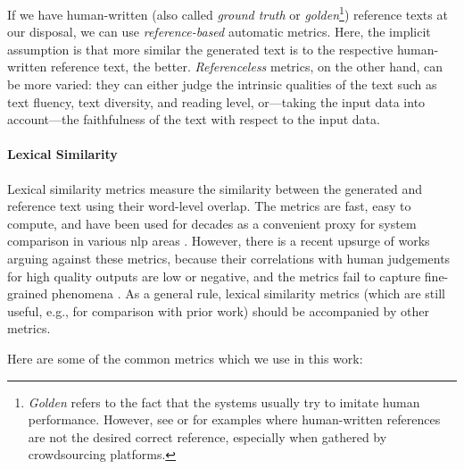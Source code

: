 If we have human-written (also called \emph{ground truth} or \emph{golden}\footnote{\emph{Golden} refers to the fact that the systems usually try to imitate human performance. However, see \citet{clarkAllThatHuman2021} or \citet{dusekSemanticNoiseMatters2019} for examples where human-written references are not the desired correct reference, especially when gathered by crowdsourcing platforms.}) reference texts at our disposal, we can use \emph{reference-based}  automatic metrics. Here, the implicit assumption is that more similar the generated text is to the respective human-written reference text, the better. \emph{Referenceless} metrics, on the other hand, can be more varied: they can either judge the intrinsic qualities of the text such as text fluency, text diversity, and reading level, or---taking the input data into account---the faithfulness of the text with respect to the input data.


\paragraph{Lexical Similarity} Lexical similarity metrics measure the similarity between the generated and reference text using their word-level overlap. The metrics are fast, easy to compute, and have been used for decades as a convenient proxy for system comparison in various \ac{nlp} areas \cite{celikyilmazEvaluationTextGeneration2021}. However, there is a recent upsurge of works arguing against these metrics, because their correlations with human judgements for high quality outputs are low or negative, and the metrics fail to capture fine-grained phenomena \cite{mathurTangledBLEUReevaluating2020,kocmiShipNotShip2021,gehrmannRepairingCrackedFoundation2022}. As a general rule, lexical similarity metrics (which are still useful, e.g., for comparison with prior work) should be accompanied by other metrics.

Here are some of the common metrics which we use in this work:

